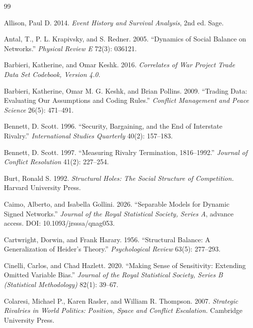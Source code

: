 \documentclass[Afour,sageh,times,doublespace]{sagej}
\begin{document}
\begin{thebibliography}{99}

 Allison, Paul D. 2014. \emph{Event History and Survival Analysis}, 2nd ed. Sage.

 Antal, T., P. L. Krapivsky, and S. Redner. 2005. ``Dynamics of Social Balance on Networks.'' \emph{Physical Review E} 72(3): 036121.

 Barbieri, Katherine, and Omar Keshk. 2016. \emph{Correlates of War Project Trade Data Set Codebook, Version 4.0.}

 Barbieri, Katherine, Omar M. G. Keshk, and Brian Pollins. 2009. ``Trading Data: Evaluating Our Assumptions and Coding Rules.'' \emph{Conflict Management and Peace Science} 26(5): 471--491.

 Bennett, D. Scott. 1996. ``Security, Bargaining, and the End of Interstate Rivalry.'' \emph{International Studies Quarterly} 40(2): 157--183.

 Bennett, D. Scott. 1997. ``Measuring Rivalry Termination, 1816--1992.'' \emph{Journal of Conflict Resolution} 41(2): 227--254.

 Burt, Ronald S. 1992. \emph{Structural Holes: The Social Structure of Competition.} Harvard University Press.

 Caimo, Alberto, and Isabella Gollini. 2026. ``Separable Models for Dynamic Signed Networks.'' \emph{Journal of the Royal Statistical Society, Series A}, advance access. DOI: 10.1093/jrsssa/qnag053.

 Cartwright, Dorwin, and Frank Harary. 1956. ``Structural Balance: A Generalization of Heider's Theory.'' \emph{Psychological Review} 63(5): 277--293.

 Cinelli, Carlos, and Chad Hazlett. 2020. ``Making Sense of Sensitivity: Extending Omitted Variable Bias.'' \emph{Journal of the Royal Statistical Society, Series B (Statistical Methodology)} 82(1): 39--67.

 Colaresi, Michael P., Karen Rasler, and William R. Thompson. 2007. \emph{Strategic Rivalries in World Politics: Position, Space and Conflict Escalation.} Cambridge University Press.


\end{thebibliography}
\end{document}
